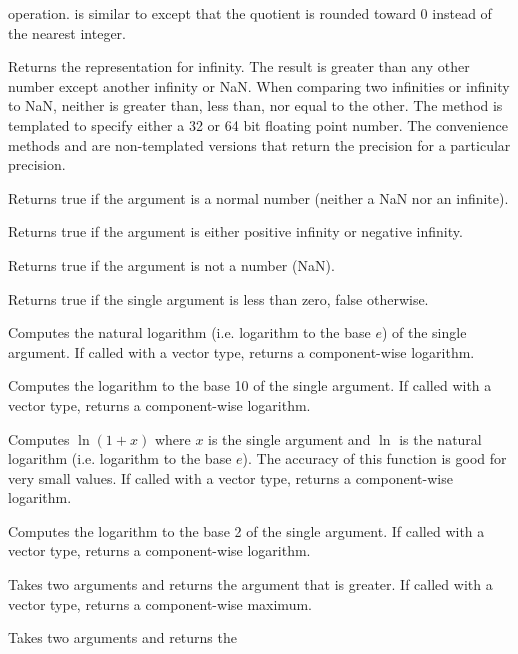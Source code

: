 \begin{description}
  operation.  is similar to 
  except that the quotient is rounded toward 0 instead of the nearest
  integer.
\item[\vtkm{Infinity}] Returns the representation for infinity. The result
  is greater than any other number except another infinity or NaN. When
  comparing two infinities or infinity to NaN, neither is greater than,
  less than, nor equal to the other. The  method
  is templated to specify either a 32 or 64 bit floating point number. The
  convenience methods  and
   are non-templated versions that return the
  precision for a particular precision.
\item[\vtkm{IsFinite}] Returns true if the argument is a normal number
  (neither a NaN nor an infinite).
\item[\vtkm{IsInf}] Returns true if the argument is either positive
  infinity or negative infinity.
\item[\vtkm{IsNan}] Returns true if the argument is not a number (NaN).
\item[\vtkm{IsNegative}]  Returns true if the single
  argument is less than zero, false otherwise.
\item[\vtkm{Log}]   Computes
  the natural logarithm (i.e. logarithm to the base $e$) of the single
  argument. If called with a vector type, returns a component-wise
  logarithm.
\item[\vtkm{Log10}]  Computes the logarithm to the base
  10 of the single argument. If called with a vector type, returns a
  component-wise logarithm.
\item[\vtkm{Log1P}]   Computes
  $\ln(1+x)$ where $x$ is the single argument and $\ln$ is the natural
  logarithm (i.e. logarithm to the base $e$). The accuracy of this function
  is good for very small values. If called with a vector type, returns a
  component-wise logarithm.
\item[\vtkm{Log2}]  Computes the logarithm to the base
  2 of the single argument. If called with a vector type, returns a
  component-wise logarithm.
\item[\vtkm{Max}]  Takes two arguments and returns the
  argument that is greater. If called with a vector type, returns a
  component-wise maximum.
\item[\vtkm{Min}]  Takes two arguments and returns the

\end{description}
